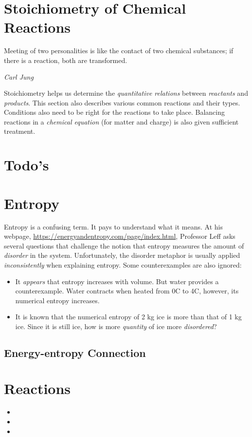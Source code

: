 \documentclass{article}
\begin{document}
\section{Stoichiometry of Chemical Reactions}
\renewcommand{\epigraphsize}{\small}
\setlength{\epigraphwidth}{0.8\textwidth}
\epigraph
{
    Meeting of two personalities is like the contact of two chemical substances; if there is a reaction, both are transformed.
}
{
    \textit{Carl Jung}
}

\label{sec: stoichiometry}
Stoichiometry helps us determine the \textit{quantitative relations} between \textit{reactants} and \textit{products}. This section also describes various common reactions and their types. Conditions also need to be right for the reactions to take place. Balancing reactions in a \textit{chemical equation} (for matter and charge) is also given sufficient treatment.

\section{Todo's} 
\section{Entropy}
Entropy is a confusing term. It pays to understand what it means.
At his webpage, \url{https://energyandentropy.com/page/index.html}, Professor Leff asks several questions that challenge the notion that entropy measures the amount of \textit{disorder} in the system. Unfortunately, the disorder metaphor is usually applied \textit{inconsistently} when explaining entropy. Some counterexamples are also ignored:
\begin{itemize}
    \item It \textit{appears} that entropy increases with volume. But water provides a counterexample. Water contracts when heated from 0\degree C to 4\degree C, however, its numerical entropy increases.
    \item It is known that the numerical entropy of 2 kg ice is more than that of 1 kg ice. Since it is still ice, how is more \textit{quantity} of ice more \textit{disordered}?
\end{itemize}

\subsection{Energy-entropy Connection}

\section{Reactions}
\begin{itemize}
    \item {}
    \item {}
    \item {}
\end{itemize}
\end{document}
